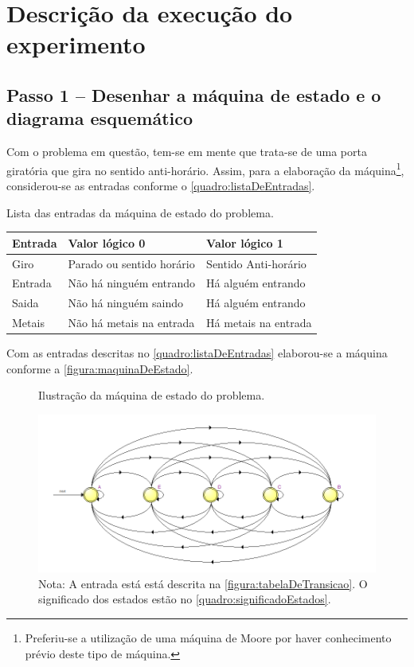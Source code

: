 \chapter{Descrição da execução do experimento}
	\section{Passo 1 – Desenhar a máquina de estado e o diagrama esquemático}
		Com o problema em questão, tem-se em mente que trata-se de uma porta giratória
		que gira no sentido anti-horário.
		Assim, para a elaboração da máquina\footnote{Preferiu-se a utilização de uma máquina de Moore
		por haver conhecimento prévio deste tipo de máquina.}, considerou-se as entradas conforme o
		\autoref{quadro:listaDeEntradas}.

		\begin{quadro}[H]
			\centering
			\caption{Lista das entradas da máquina de estado do problema.}
			\label{quadro:listaDeEntradas}
			\begin{tabular}{|l|l|l|}
			  \hline
			   \textbf{Entrada} & \textbf{Valor lógico 0}  & \textbf{Valor lógico 1}\\
			    \hline
				   Giro & Parado ou sentido horário & Sentido Anti-horário \\
			   	\hline
			   		Entrada & Não há ninguém entrando & Há alguém entrando \\
			    \hline
					Saida & Não há ninguém saindo & Há alguém entrando \\
			    \hline
			    	Metais & Não há metais na entrada & Há metais na entrada \\
			    \hline
			\end{tabular}
		\end{quadro}

		Com as entradas descritas no \autoref{quadro:listaDeEntradas} elaborou-se a máquina conforme a
		\autoref{figura:maquinaDeEstado}.

		\begin{figure}[H]
			 \centering
			 \caption{\label{figura:maquinaDeEstado}Ilustração da máquina de estado do problema.}
			 \includegraphics[width=1\textwidth]{img/maquinaDeEstados}
			 \caption*{Nota: A entrada está está descrita na \autoref{figura:tabelaDeTransicao}. O
			  significado dos estados estão no \autoref{quadro:significadoEstados}.}
		\end{figure}

